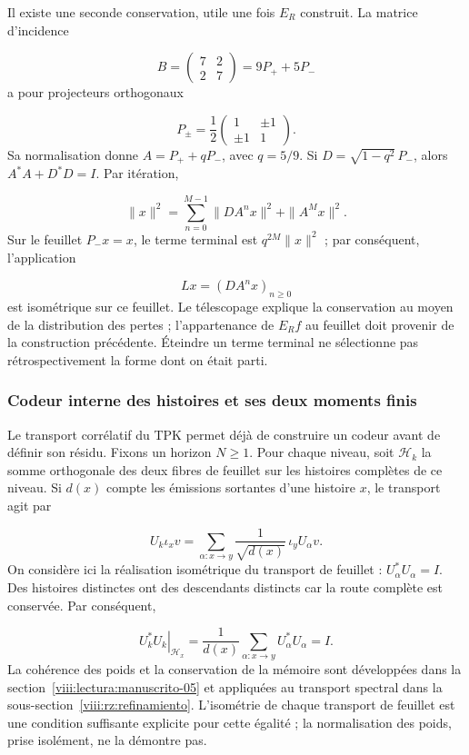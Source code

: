 Il existe une seconde conservation, utile une fois \(E_R\) construit. La matrice d'incidence

\[
B=\begin{pmatrix}7&2\\2&7\end{pmatrix}=9P_++5P_-
\]
a pour projecteurs orthogonaux

\[
P_\pm=\frac12
\begin{pmatrix}1&\pm1\\\pm1&1\end{pmatrix}.
\]
Sa normalisation donne \(A=P_++qP_-\), avec \(q=5/9\). Si \(D=\sqrt{1-q^2}\,P_-\), alors \(A^*A+D^*D=I\). Par itération,

\[
\|x\|^2=\sum_{n=0}^{M-1}\|DA^nx\|^2+\|A^Mx\|^2.
\]
Sur le feuillet \(P_-x=x\), le terme terminal est \(q^{2M}\|x\|^2\) ; par conséquent, l'application

\[
Lx=(DA^nx)_{n\geq0}
\]
est isométrique sur ce feuillet. Le télescopage explique la conservation au moyen de la distribution des pertes ; l’appartenance de \(E_Rf\) au feuillet doit provenir de la construction précédente. Éteindre un terme terminal ne sélectionne pas rétrospectivement la forme dont on était parti.

\subsubsection*{Codeur interne des histoires et ses deux moments finis}
Le transport corrélatif du TPK permet déjà de construire un codeur avant de définir son résidu. Fixons un horizon \(N\geq1\). Pour chaque niveau, soit \(\mathscr H_k\) la somme orthogonale des deux fibres de feuillet sur les histoires complètes de ce niveau. Si \(d(x)\) compte les émissions sortantes d'une histoire \(x\), le transport agit par

\[
U_k\iota_xv=
\sum_{\alpha:x\to y}\frac1{\sqrt{d(x)}}\,\iota_yU_\alpha v.
\]
On considère ici la réalisation isométrique du transport de feuillet : \(U_\alpha^*U_\alpha=I\). Des histoires distinctes ont des descendants distincts car la route complète est conservée. Par conséquent,

\[
\left.U_k^*U_k\right|_{\mathscr H_x}
=\frac1{d(x)}\sum_{\alpha:x\to y}U_\alpha^*U_\alpha=I.
\]
La cohérence des poids et la conservation de la mémoire sont développées dans la section~\ref{viii:lectura:manuscrito-05} et appliquées au transport spectral dans la sous-section~\ref{viii:rz:refinamiento}. L'isométrie de chaque transport de feuillet est une condition suffisante explicite pour cette égalité ; la normalisation des poids, prise isolément, ne la démontre pas.

